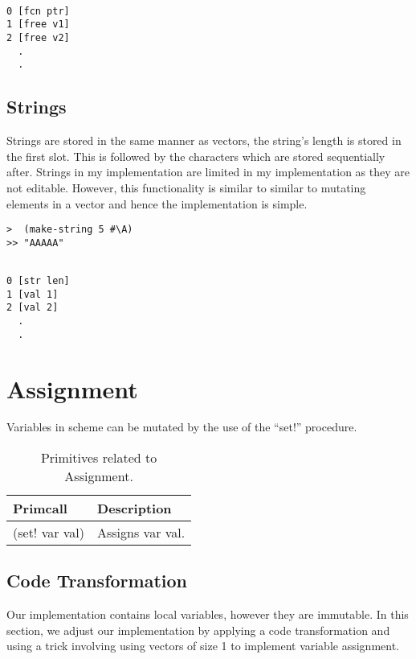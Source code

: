 \documentclass{article}
\begin{document}
\begin{verbatim}

0 [fcn ptr]
1 [free v1]
2 [free v2]
  .
  .

\end{verbatim}

\subsection{Strings}

Strings are stored in the same manner as vectors, the string's length is stored in the first slot. This is followed by the characters which are stored sequentially after. Strings in my implementation are limited in my implementation as they are not editable. However, this functionality is similar to similar to mutating elements in a vector and hence the implementation is simple.

\begin{verbatim}
>  (make-string 5 #\A)
>> "AAAAA"

\end{verbatim}

\begin{verbatim}

0 [str len]
1 [val 1]
2 [val 2]
  .
  .

\end{verbatim}



\section{Assignment}

Variables in scheme can be mutated by the use of the ``set!'' procedure.  

\begin{table}[ht]
  \centering
\begin{tabular}{ l l }
  \toprule
  Primcall & Description \\ \hline
  \midrule
  (set! var val) & Assigns var val.  \\
  \bottomrule
\end{tabular}
\caption{Primitives related to Assignment.} \label{tab:assignment}
\end{table}

\subsection{Code Transformation}

Our implementation contains local variables, however they are immutable. In this section, we adjust our implementation by applying a code transformation and using a trick involving using vectors of size 1 to implement variable assignment. 
\end{document}
